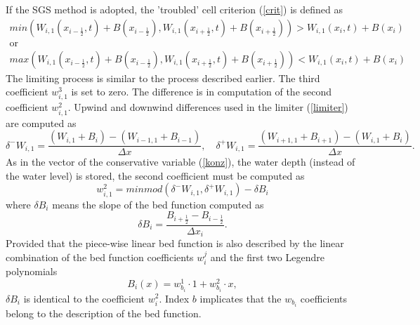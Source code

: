 If the SGS method is adopted, the 'troubled' cell criterion (\ref{crit}) is defined as 
\begin{equation}\label{critH}
\begin{array}{c}
 min\left(W_{i,1}(x_{i-\frac12},t)+B(x_{i-\frac12}),W_{i,1}(x_{i+\frac12},t)+B(x_{i+\frac12})\right)>W_{i,1}(x_i,t)+B(x_i)\\ 
\text{or}\\
 max\left(W_{i,1}(x_{i-\frac12},t)+B(x_{i-\frac12}),W_{i,1}(x_{i+\frac12},t)+B(x_{i+\frac12})\right)< W_{i,1}(x_i,t)+B(x_i)
 \end{array}
\end{equation}
The limiting process is similar to the process described earlier. The third coefficient $w_{i,1}^{3}$ is set to zero. The difference is in computation of the second coefficient $w_{i,1}^{2}$. Upwind and downwind differences used in the limiter (\ref{limiter}) are computed as 
\begin{equation}\label{diffH}
\delta^- W_{i,1}=\frac{\left(W_{i,1}+B_{i}\right) - \left(W_{i-1,1}+B_{i-1} \right)}{\Delta x},\quad \delta^+W_{i,1}=\frac{\left(W_{i+1,1}+B_{i+1}\right) - \left(W_{i,1}+B_{i} \right)}{\Delta x}.
\end{equation}
As in the vector of the conservative variable (\ref{konz}), the water depth (instead of the water level) is stored, the second coefficient must be computed as
\begin{equation}
w_{i,1}^{2}=minmod(\delta^- W_{i,1},\delta^+ W_{i,1})-\delta B_i
\end{equation}
where $\delta B_i$ means the slope of the bed function computed as
\begin{equation}
\delta B_i=\frac{B_{i+\frac12}-B_{i-\frac12}}{\Delta x_i}.
\end{equation}
 Provided that the piece-wise linear bed function is also described by the linear combination of the bed function coefficients $w_{i}^j$ and the first two Legendre polynomials
\begin{equation}
 B_i(x)=w_{b_{i}}^1 \cdot 1+w_{b_{i}}^2 \cdot x,
 \end{equation} 
 $\delta B_i$ is identical to the coefficient $w_{i}^2$. Index $b$ implicates that the $w_{b_{i}}$ coefficients belong to the description of the bed function.